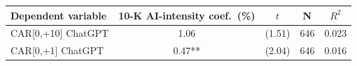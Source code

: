\begin{tabular}{lcccc}
\toprule
Dependent variable & 10-K AI-intensity coef.\ (\%) & $t$ & N & $R^2$ \\
\midrule
CAR[0,+10] ChatGPT & 1.06 & (1.51) & 646 & 0.023 \\
CAR[0,+1] ChatGPT & 0.47** & (2.04) & 646 & 0.016 \\
\bottomrule
\end{tabular}